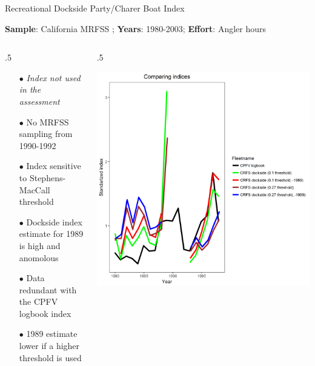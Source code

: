\documentclass[ignorenonframetext,]{beamer}
\def\begincols{\begin{columns}}
\def\begincol{\begin{column}}
\def\endcol{\end{column}}
\def\endcols{\end{columns}}
\begin{document}
\begin{frame}{Recreational Dockside Party/Charer Boat Index}

\textbf{Sample}: California MRFSS ; \textbf{Years}: 1980-2003;
\textbf{Effort}: Angler hours

\begincols
 \begincol{.5\textwidth}

\begin{itemize}
\item[$\bullet$] \emph{Index not used in the assessment}
\item[$\bullet$] No MRFSS sampling from 1990-1992
\item[$\bullet$] Index sensitive to Stephens-MacCall threshold
\item[$\bullet$] Dockside index estimate for 1989 is high and anomolous
\item[$\bullet$] Data redundant with the CPFV logbook index
\item[$\bullet$] 1989 estimate lower if a higher threshold is used
\end{itemize}

\endcol
 \begincol{.5\textwidth}

\includegraphics{Figures/Fleet5_RecPC_dockside_index_compare.png}

\endcol
\endcols

\end{frame}
\end{document}
